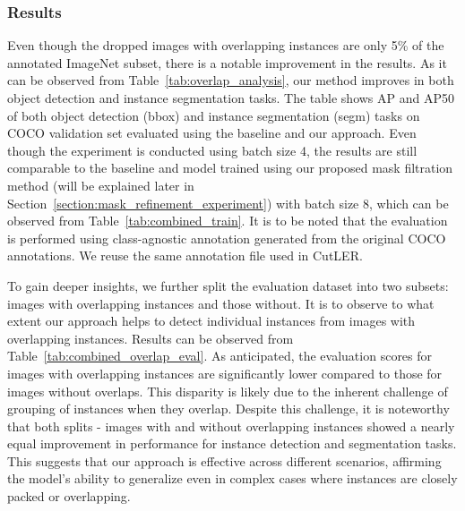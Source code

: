 \subsubsection{Results}
\label{section:overlapping-results}
Even though the dropped images with overlapping instances are only 5\% of the annotated ImageNet subset, there is a notable improvement in the results. As it can be observed from Table~\ref{tab:overlap_analysis}, our method improves in both object detection and instance segmentation tasks. The table shows AP and AP50 of both object detection (bbox) and instance segmentation (segm) tasks on COCO validation set evaluated using the baseline and our approach. Even though the experiment is conducted using batch size 4, the results are still comparable to the baseline and model trained using our proposed mask filtration method (will be explained later in Section~\ref{section:mask_refinement_experiment}) with batch size 8, which can be observed from Table~\ref{tab:combined_train}. It is to be noted that the evaluation is performed using class-agnostic annotation generated from the original COCO annotations. We reuse the same annotation file used in CutLER.

To gain deeper insights, we further split the evaluation dataset into two subsets: images with overlapping instances and those without. It is to observe to what extent our approach helps to detect individual instances from images with overlapping instances. Results can be observed from Table~\ref{tab:combined_overlap_eval}. As anticipated, the evaluation scores for images with overlapping instances are significantly lower compared to those for images without overlaps. This disparity is likely due to the inherent challenge of grouping of instances when they overlap. Despite this challenge, it is noteworthy that both splits - images with and without overlapping instances showed a nearly equal improvement in performance for instance detection and segmentation tasks. This suggests that our approach is effective across different scenarios, affirming the model’s ability to generalize even in complex cases where instances are closely packed or overlapping.

